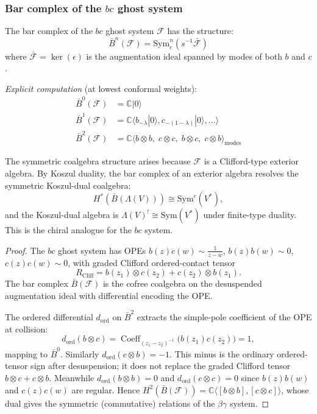 \subsubsection{\texorpdfstring{Bar complex of the $bc$ ghost system}{Bar complex of the bc ghost system}}

\begin{proposition}
\label{prop:bar-bc-system}
The bar complex of the $bc$ ghost system $\mathcal{F}$ has the structure:
\[\bar{B}^n(\mathcal{F}) = \mathrm{Sym}^n_c(s^{-1}\bar{\mathcal{F}})\]
where $\bar{\mathcal{F}} = \ker(\epsilon)$ is the augmentation ideal spanned by modes of both $b$ and $c$.

\emph{Explicit computation} (at lowest conformal weights):
\begin{align}
\bar{B}^0(\mathcal{F}) &= \mathbb{C}|0\rangle \\
\bar{B}^1(\mathcal{F}) &= \mathbb{C}\langle b_{-\lambda}|0\rangle, c_{-(1-\lambda)}|0\rangle, \ldots \rangle \\
\bar{B}^2(\mathcal{F}) &= \mathbb{C}\langle b \otimes b,\; c \otimes c,\; b \otimes c,\; c \otimes b \rangle_{\text{modes}}
\end{align}

The symmetric coalgebra structure arises because $\mathcal{F}$ is a
Clifford-type exterior algebra. By Koszul duality, the bar complex
of an exterior algebra resolves the symmetric Koszul-dual coalgebra:
\[
H^*(\bar{B}(\Lambda(V))) \cong \mathrm{Sym}^c(V^*),
\]
and the Koszul-dual algebra is
$\Lambda(V)^! \cong \mathrm{Sym}(V^*)$ under finite-type duality.
This is the chiral analogue for the $bc$ system.
\end{proposition}

\begin{proof}
The $bc$ ghost system has OPEs $b(z)c(w) \sim \frac{1}{z-w}$,
$b(z)b(w) \sim 0$, $c(z)c(w) \sim 0$, with graded Clifford
ordered-contact tensor
\[
R_{\mathrm{Cliff}}
=b(z_1)\otimes c(z_2)+c(z_2)\otimes b(z_1).
\]
The bar complex $\bar{B}(\mathcal{F})$ is the cofree coalgebra on the desuspended augmentation ideal with differential encoding the OPE.

The ordered differential $d_{\mathrm{ord}}$ on $\bar{B}^2$ extracts
the simple-pole coefficient of the OPE at collision:
\[
d_{\mathrm{ord}}(b \otimes c)
=
\operatorname{Coeff}_{(z_1-z_2)^{-1}}
\bigl(b(z_1)c(z_2)\bigr)=1,
\]
mapping to $\bar{B}^0$. Similarly
$d_{\mathrm{ord}}(c \otimes b) = -1$. This minus is the ordinary
ordered-tensor sign after desuspension; it does not replace
the graded Clifford tensor $b\otimes c+c\otimes b$. Meanwhile
$d_{\mathrm{ord}}(b \otimes b) = 0$ and
$d_{\mathrm{ord}}(c \otimes c) = 0$ since $b(z)b(w)$ and
$c(z)c(w)$ are regular.
Hence $H^2(\bar{B}(\mathcal{F}))
= \mathbb{C}\langle [b \otimes b], [c \otimes c] \rangle$,
whose dual gives the symmetric (commutative) relations of the $\beta\gamma$ system.
\end{proof}

